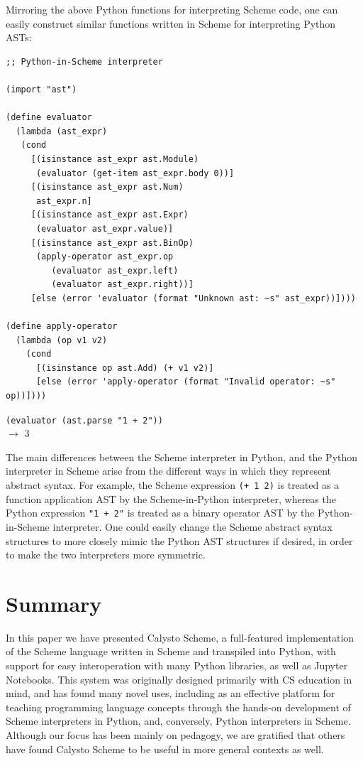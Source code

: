 \documentclass[acmsmall,screen,authorversion]{acmart}
\begin{document}
Mirroring the above Python functions for interpreting Scheme code, one can
easily construct similar functions written in Scheme for interpreting Python
ASTs:\\

\begin{minipage}{\textwidth}
{\small
\begin{verbatim}
;; Python-in-Scheme interpreter

(import "ast")

(define evaluator
  (lambda (ast_expr)
   (cond
     [(isinstance ast_expr ast.Module)
      (evaluator (get-item ast_expr.body 0))]
     [(isinstance ast_expr ast.Num)
      ast_expr.n]
     [(isinstance ast_expr ast.Expr)
      (evaluator ast_expr.value)]
     [(isinstance ast_expr ast.BinOp)
      (apply-operator ast_expr.op
         (evaluator ast_expr.left)
         (evaluator ast_expr.right))]
     [else (error 'evaluator (format "Unknown ast: ~s" ast_expr))])))

(define apply-operator
  (lambda (op v1 v2)
    (cond
      [(isinstance op ast.Add) (+ v1 v2)]
      [else (error 'apply-operator (format "Invalid operator: ~s" op))])))

\end{verbatim}
\texttt{(evaluator (ast.parse "1 + 2"))}\\
$\rightarrow$ 3\\
}
\end{minipage}

\noindent
The main differences between the Scheme interpreter in Python, and the Python
interpreter in Scheme arise from the different ways in which they represent
abstract syntax.  For example, the Scheme expression \texttt{(+~1~2)} is
treated as a function application AST by the Scheme-in-Python interpreter,
whereas the Python expression \texttt{"1~+~2"} is treated as a binary operator
AST by the Python-in-Scheme interpreter.  One could easily change the Scheme
abstract syntax structures to more closely mimic the Python AST structures if
desired, in order to make the two interpreters more symmetric.

\section{Summary}

In this paper we have presented Calysto Scheme, a full-featured implementation
of the Scheme language written in Scheme and transpiled into Python, with
support for easy interoperation with many Python libraries, as well as Jupyter
Notebooks. This system was originally designed primarily with CS education in
mind, and has found many novel uses, including as an effective platform for
teaching programming language concepts through the hands-on development of
Scheme interpreters in Python, and, conversely, Python interpreters in
Scheme. Although our focus has been mainly on pedagogy, we are gratified that
others have found Calysto Scheme to be useful in more general contexts as well.
\end{document}
